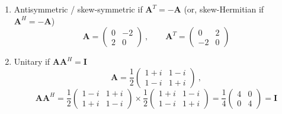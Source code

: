 \documentclass[12pt]{article}
\newcommand{\ve}[1]{\ensuremath{\mathbf{#1}}}
\begin{document}
\begin{enumerate}
\item Antisymmetric / skew-symmetric if $\ve{A}^T = -\ve{A}$ (or, skew-Hermitian if $\ve{A}^H = -\ve{A}$)
%
\renewcommand{\aaa}{0}
\renewcommand{\aab}{-2}
\renewcommand{\aba}{2}
\renewcommand{\abb}{0}
%
\begin{equation}
\ve{A} = \begin{pmatrix}
   \aaa & \aab \\
   \aba & \abb 
\end{pmatrix}\:, \qquad
%
\ve{A}^T = \begin{pmatrix}
   \aaa & \aba \\
   \aab & \abb 
\end{pmatrix} \nonumber
\end{equation}

\item Unitary if $\ve{A}\ve{A}^H = \ve{I}$
%
\begin{equation}
\ve{A} = \frac{1}{2}\begin{pmatrix}
   1+i & 1-i \\
   1-i & 1+i 
\end{pmatrix}\:,\nonumber
\end{equation}
%
\begin{equation}
\ve{AA}^H = \frac{1}{2}\begin{pmatrix}
   1-i & 1+i \\
   1+i & 1-i 
\end{pmatrix}  \times
\frac{1}{2}\begin{pmatrix}
   1+i & 1-i \\
   1-i & 1+i 
\end{pmatrix} =
\frac{1}{4}\begin{pmatrix}
   4 & 0 \\
   0 & 4 
\end{pmatrix} = \ve{I}\nonumber
\end{equation}


\end{enumerate}
\end{document}
